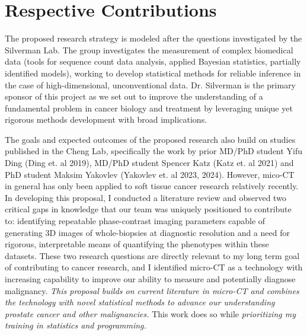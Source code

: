 \documentclass{NIHGrant}
\begin{document}
\part*{Respective Contributions}
The proposed research strategy is modeled after the questions investigated by the Silverman Lab. The group investigates the measurement of complex biomedical data (tools for sequence count data analysis, applied Bayesian statistics, partially identified models), working to develop statistical methods for reliable inference in the case of high-dimensional, unconventional data. Dr. Silverman is the primary sponsor of this project as we set out to improve the understanding of a fundamental problem in cancer biology and treatment by leveraging unique yet rigorous methods development with broad implications.

The goals and expected outcomes of the proposed research also build on studies published in the Cheng Lab, specifically the work by prior MD/PhD student Yifu Ding (Ding et. al 2019), MD/PhD student Spencer Katz (Katz et. al 2021) and PhD student Maksim Yakovlev (Yakovlev et. al 2023, 2024). However, mico-CT in general has only been applied to soft tissue cancer research relatively recently. In developing this proposal, I conducted a literature review and observed two critical gaps in knowledge that our team was uniquely positioned to contribute to: identifying repeatable phase-contrast imaging parameters capable of generating 3D images of whole-biopsies at diagnostic resolution and a need for rigorous, interpretable means of quantifying the phenotypes within these datasets. These two research questions are directly relevant to my long term goal of contributing to cancer research, and I identified micro-CT as a technology with increasing capability to improve our ability to measure and potentially diagnose malignancy. \emph{This proposal builds on current literature in micro-CT and combines the technology with novel statistical methods to advance our understanding prostate cancer and other malignancies.} This work does so while \emph{prioritizing my training in statistics and programming.}
\end{document}
